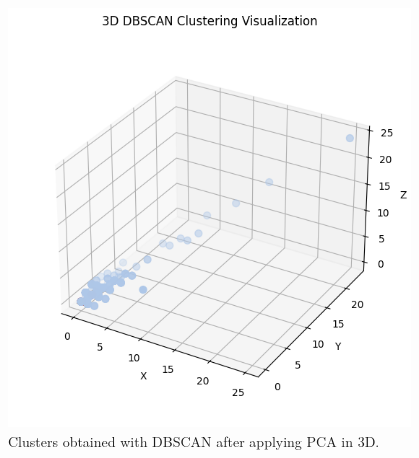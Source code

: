 \begin{appendices}
\begin{figure}[H]
\begin{minipage}[t]{0.48\textwidth}
			\includegraphics[width=0.95\textwidth]{../imgs/graphs/clustering/dbscan_nopca_3d.png}
			\caption{Clusters obtained with DBSCAN after applying PCA in 3D.}
			\label{fig:clusters_dbscan_no_pca_3d}
		\end{minipage}
	\end{figure}


\end{appendices}

